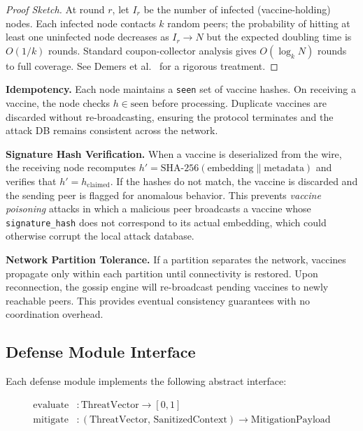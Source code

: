 \documentclass[sigconf,natbib=false]{acmart}
\begin{document}
\begin{proof}[Proof Sketch]
At round $r$, let $I_r$ be the number of infected (vaccine-holding) nodes.
Each infected node contacts $k$ random peers; the probability of hitting
at least one uninfected node decreases as $I_r \to N$ but the expected
doubling time is $O(1/k)$ rounds. Standard coupon-collector analysis
gives $O(\log_k N)$ rounds to full coverage.
See Demers et al.~\cite{demers1987epidemic} for a rigorous treatment.
\end{proof}

\textbf{Idempotency.}
Each node maintains a \texttt{seen} set of vaccine hashes. On receiving a
vaccine, the node checks $h \in \text{seen}$ before processing. Duplicate
vaccines are discarded without re-broadcasting, ensuring the protocol
terminates and the attack DB remains consistent across the network.

\textbf{Signature Hash Verification.}
When a vaccine is deserialized from the wire, the receiving node recomputes
$h' = \text{SHA-256}(\text{embedding} \| \text{metadata})$ and verifies that
$h' = h_\text{claimed}$. If the hashes do not match, the vaccine is discarded
and the sending peer is flagged for anomalous behavior. This prevents
\emph{vaccine poisoning} attacks in which a malicious peer broadcasts a vaccine
whose \texttt{signature\_hash} does not correspond to its actual embedding,
which could otherwise corrupt the local attack database.

\textbf{Network Partition Tolerance.}
If a partition separates the network, vaccines propagate only within each
partition until connectivity is restored. Upon reconnection, the gossip
engine will re-broadcast pending vaccines to newly reachable peers.
This provides eventual consistency guarantees with no coordination overhead.

\subsection{Defense Module Interface}
\label{sec:defense}

Each defense module implements the following abstract interface:

\begin{align}
\label{eq:defense_interface}
\text{evaluate} &: \text{ThreatVector} \to [0, 1] \\
\text{mitigate} &: (\text{ThreatVector},\, \text{SanitizedContext}) \to \text{MitigationPayload}
\end{align}
\end{document}
